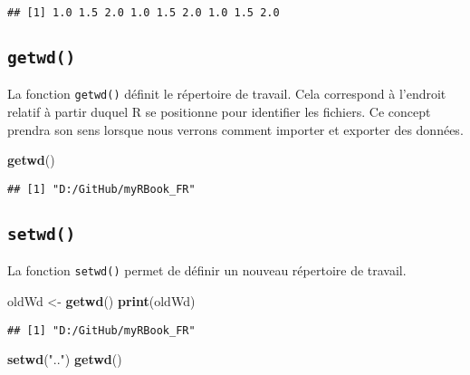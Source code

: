 \documentclass[]{book}
\newenvironment{Shaded}{\begin{snugshade}}{\end{snugshade}}
\newcommand{\KeywordTok}[1]{\textcolor[rgb]{0.13,0.29,0.53}{\textbf{#1}}}
\newcommand{\StringTok}[1]{\textcolor[rgb]{0.31,0.60,0.02}{#1}}
\newcommand{\NormalTok}[1]{#1}
\theoremstyle{definition}
\theoremstyle{definition}
\theoremstyle{definition}
\theoremstyle{remark}
\begin{document}
\begin{verbatim}
## [1] 1.0 1.5 2.0 1.0 1.5 2.0 1.0 1.5 2.0
\end{verbatim}

\hypertarget{l015getwd}{\subsection{\texorpdfstring{\texttt{getwd()}}{getwd()}}\label{l015getwd}}

La fonction \texttt{getwd()} définit le répertoire de travail. Cela
correspond à l'endroit relatif à partir duquel R se positionne pour
identifier les fichiers. Ce concept prendra son sens lorsque nous
verrons comment importer et exporter des données.

\begin{Shaded}
\begin{Highlighting}[]
\KeywordTok{getwd}\NormalTok{()}
\end{Highlighting}
\end{Shaded}

\begin{verbatim}
## [1] "D:/GitHub/myRBook_FR"
\end{verbatim}

\hypertarget{l015setwd}{\subsection{\texorpdfstring{\texttt{setwd()}}{setwd()}}\label{l015setwd}}

La fonction \texttt{setwd()} permet de définir un nouveau répertoire de
travail.

\begin{Shaded}
\begin{Highlighting}[]
\NormalTok{oldWd <-}\StringTok{ }\KeywordTok{getwd}\NormalTok{()}
\KeywordTok{print}\NormalTok{(oldWd)}
\end{Highlighting}
\end{Shaded}

\begin{verbatim}
## [1] "D:/GitHub/myRBook_FR"
\end{verbatim}

\begin{Shaded}
\begin{Highlighting}[]
\KeywordTok{setwd}\NormalTok{(}\StringTok{".."}\NormalTok{)}
\KeywordTok{getwd}\NormalTok{()}
\end{Highlighting}
\end{Shaded}
\end{document}
